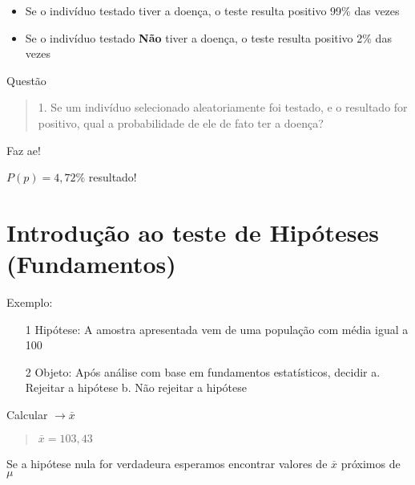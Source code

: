 \documentclass{article}
\begin{document}
    \begin{itemize}
      \item Se o indivíduo testado tiver a doença, o teste resulta positivo 99\% das vezes
      \item Se o indivíduo testado \textbf{Não} tiver a doença, o teste resulta positivo 2\% das vezes
    \end{itemize}

    Questão

    \begin{quote}
      1. Se um indivíduo selecionado aleatoriamente foi testado, e o resultado for positivo, qual a 
      probabilidade de ele de fato ter a doença?
    \end{quote}

    Faz ae!

    \begin{center}
    $ P(p) = 4,72\% $ resultado!
    \end{center} 

    \newpage

  \section{Introdução ao teste de Hipóteses (Fundamentos)}

      Exemplo:
  
    \begin{itemize}
      \item[1] Hipótese: A amostra apresentada vem de uma população com média igual a 100
      \item[2] Objeto: Após análise com base em fundamentos estatísticos, decidir
      \subitem a. Rejeitar a hipótese
      \subitem b. Não rejeitar a hipótese
    \end{itemize}

  Calcular \( \longrightarrow \overset{\_}{x} \)
  
  \begin{quote}
    \( \overset{\_}{x} = 103,43 \) 
  \end{quote}

  Se a hipótese nula for verdadeura esperamos encontrar valores de $ \overset{\_}{x} $ próximos de $ \mu $


  
  
\end{document}
